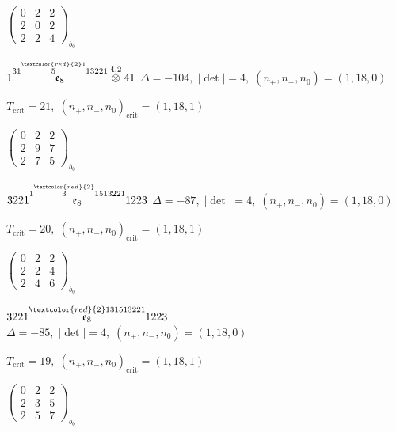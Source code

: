 \documentclass[10pt]{article}
\begin{document}
\hspace{2em}$\left(\begin{smallmatrix}0 & 2 & 2 \\ 2 & 0 & 2 \\ 2 & 2 & 4\end{smallmatrix}\right)_{\!b_0}$

\smallskip

$1\overset{31\overset{\textcolor{red}{2}1}{5}13221}{\mathfrak{e}_8}\overset{4,2}{\otimes}41$ \quad $\Delta=-104,\; |\det|=4,\; (n_+,n_-,n_0)=(1,18,0)$

\hspace{1em}$T_{\text{crit}}=21,\; (n_+,n_-,n_0)_{\text{crit}}=(1,18,1)$

\hspace{2em}$\left(\begin{smallmatrix}0 & 2 & 2 \\ 2 & 9 & 7 \\ 2 & 7 & 5\end{smallmatrix}\right)_{\!b_0}$

\smallskip

$3221\overset{1\overset{\textcolor{red}{2}}{3}1513221}{\mathfrak{e}_8}1223$ \quad $\Delta=-87,\; |\det|=4,\; (n_+,n_-,n_0)=(1,18,0)$

\hspace{1em}$T_{\text{crit}}=20,\; (n_+,n_-,n_0)_{\text{crit}}=(1,18,1)$

\hspace{2em}$\left(\begin{smallmatrix}0 & 2 & 2 \\ 2 & 2 & 4 \\ 2 & 4 & 6\end{smallmatrix}\right)_{\!b_0}$

$3221\overset{\textcolor{red}{2}131513221}{\mathfrak{e}_8}1223$ \quad $\Delta=-85,\; |\det|=4,\; (n_+,n_-,n_0)=(1,18,0)$

\hspace{1em}$T_{\text{crit}}=19,\; (n_+,n_-,n_0)_{\text{crit}}=(1,18,1)$

\hspace{2em}$\left(\begin{smallmatrix}0 & 2 & 2 \\ 2 & 3 & 5 \\ 2 & 5 & 7\end{smallmatrix}\right)_{\!b_0}$
\end{document}

